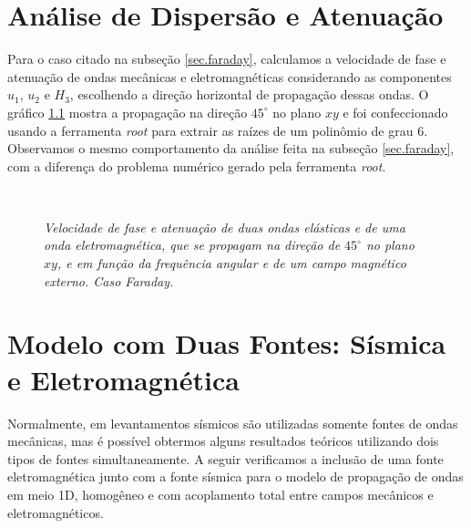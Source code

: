 
\chapter{An\'alise de Dispers\~ao e Atenua\c{c}\~ao}\label{sec.app_faraday}
Para o caso citado na subse\c{c}\~ao \ref{sec.faraday}, calculamos a velocidade de fase e atenua\c{c}\~ao de ondas mec\^anicas e eletromagn\'eticas considerando as componentes $u_1$, $u_2$ e $H_3$, escolhendo a dire\c{c}\~ao horizontal de propaga\c{c}\~ao dessas ondas. O gr\'afico \ref{fig.disp_fa_45}  mostra a propaga\c{c}\~ao na dire\c{c}\~ao $45^\circ$ no plano $xy$ e foi confeccionado usando a ferramenta \textit{root} para extrair as ra\'izes de um polin\^omio de grau 6. Observamos o mesmo comportamento da an\'alise feita na subse\c{c}\~ao \ref{sec.faraday}, com a diferen\c{c}a do problema num\'erico gerado pela ferramenta \textit{root}. 

\begin{figure}
\centering
{}
\\
\caption{\textit{Velocidade de fase e atenua\c{c}\~ao de duas ondas el\'asticas e de uma onda eletromagn\'etica, que se propagam na dire\c{c}\~ao de $45^\circ$ no plano $xy$, e em fun\c{c}\~ao da frequ\^encia angular e de um campo magn\'etico externo. Caso Faraday.}}
\label{fig.disp_fa_45}
\end{figure}


\chapter{Modelo com Duas Fontes: S\'ismica e Eletromagn\'etica}
Normalmente, em levantamentos s\'ismicos s\~ao utilizadas somente fontes de ondas mec\^anicas, mas \'e poss\'ivel obtermos alguns resultados te\'oricos utilizando dois tipos de fontes simultaneamente. A seguir verificamos a inclus\~ao de uma fonte eletromagn\'etica junto com a fonte s\'ismica para o modelo de propaga\c{c}\~ao de ondas em meio 1D, homog\^eneo e com acoplamento total entre campos mec\^anicos e eletromagn\'eticos.

